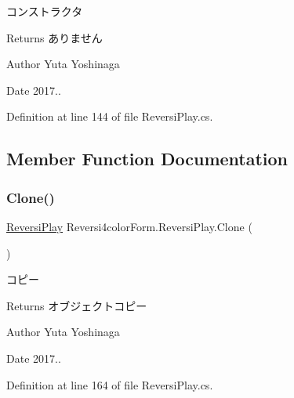 コンストラクタ 

\begin{DoxyReturn}{Returns}
ありません 
\end{DoxyReturn}
\begin{DoxyAuthor}{Author}
Yuta Yoshinaga 
\end{DoxyAuthor}
\begin{DoxyDate}{Date}
2017.. 
\end{DoxyDate}


Definition at line 144 of file Reversi\+Play.\+cs.



\subsection{Member Function Documentation}
\mbox{\label{class_reversi4color_form_1_1_reversi_play_a1a0189a3c3a2ebfe15d601fadad45813}} 
\subsubsection{\texorpdfstring{Clone()}{Clone()}}
{\footnotesize\ttfamily \hyperlink{class_reversi4color_form_1_1_reversi_play}{Reversi\+Play} Reversi4color\+Form.\+Reversi\+Play.\+Clone (\begin{DoxyParamCaption}{ }\end{DoxyParamCaption})}



コピー 

\begin{DoxyReturn}{Returns}
オブジェクトコピー 
\end{DoxyReturn}
\begin{DoxyAuthor}{Author}
Yuta Yoshinaga 
\end{DoxyAuthor}
\begin{DoxyDate}{Date}
2017.. 
\end{DoxyDate}


Definition at line 164 of file Reversi\+Play.\+cs.

\mbox{\label{class_reversi4color_form_1_1_reversi_play_ad1e6152fe3e0730872789f838cef8aad}} 
